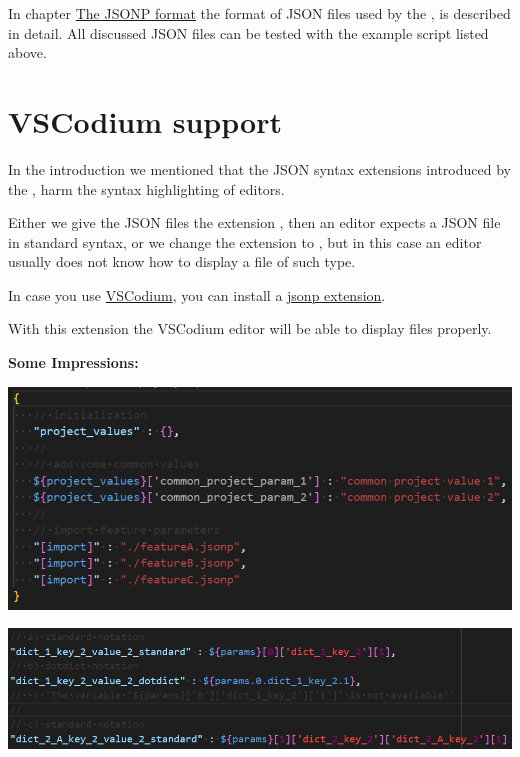 In chapter \hyperref[thejsonpformat]{The JSONP format} the format of JSON files used by the \pkg, is described in detail.
All discussed JSON files can be tested with the example script listed above.



\newpage

\section{VSCodium support}

In the introduction we mentioned that the JSON syntax extensions introduced by the \pkg, harm the syntax highlighting of editors.

Either we give the JSON files the extension , then an editor expects a JSON file in standard syntax,
or we change the extension to , but in this case an editor usually does not know how to display a file of such type.

In case you use \href{https://vscodium.com/}{VSCodium}, you can install a
\href{https://github.com/test-fullautomation/vscode-jsonp}{jsonp extension}. 

With this extension the VSCodium editor will be able to display  files properly.

\vspace{2ex}

\textbf{Some Impressions:}

\includegraphics{./pictures/screenshot1.png}

\vspace{2ex}

\includegraphics{./pictures/screenshot2.png}


